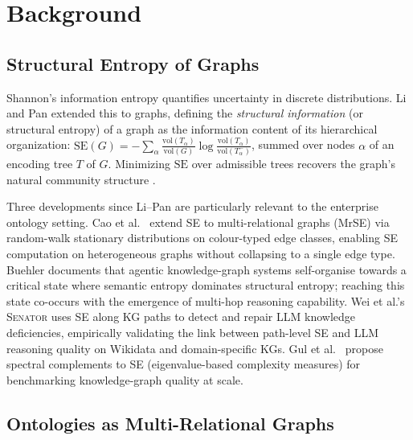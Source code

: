 \documentclass[11pt,a4paper]{article}
\newcommand{\se}{\mathrm{SE}}
\begin{document}
\section{Background}
\label{sec:background}

\subsection{Structural Entropy of Graphs}

Shannon's information entropy \citep{shannon1948mathematical} quantifies
uncertainty in discrete distributions. Li and Pan
\citep{li2016structural} extended this to graphs, defining the
\emph{structural information} (or structural entropy) of a graph as the
information content of its hierarchical organization:
$\se(G) = -\sum_\alpha \frac{\mathrm{vol}(T_\alpha)}{\mathrm{vol}(G)}
\log\frac{\mathrm{vol}(T_\alpha)}{\mathrm{vol}(T_\alpha^-)}$, summed
over nodes $\alpha$ of an encoding tree $T$ of $G$. Minimizing $\se$
over admissible trees recovers the graph's natural community structure
\citep{su2025survey,zhang2025dese}.

Three developments since Li--Pan are particularly relevant to the
enterprise ontology setting. Cao et al.\ \citep{cao2024mrse} extend SE
to multi-relational graphs (MrSE) via random-walk stationary distributions
on colour-typed edge classes, enabling SE computation on heterogeneous
graphs without collapsing to a single edge type. Buehler
\citep{buehler2025selforganizing} documents that agentic
knowledge-graph systems self-organise towards a critical state where
semantic entropy dominates structural entropy; reaching this state
co-occurs with the emergence of multi-hop reasoning capability. Wei et
al.'s \textsc{Senator} \citep{wei2025senator} uses SE along KG paths to
detect and repair LLM knowledge deficiencies, empirically validating the
link between path-level SE and LLM reasoning quality on Wikidata and
domain-specific KGs. Gul et al.\ \citep{gul2025kgcomplexity}
propose spectral complements to SE (eigenvalue-based complexity measures)
for benchmarking knowledge-graph quality at scale.

\subsection{Ontologies as Multi-Relational Graphs}
\end{document}
